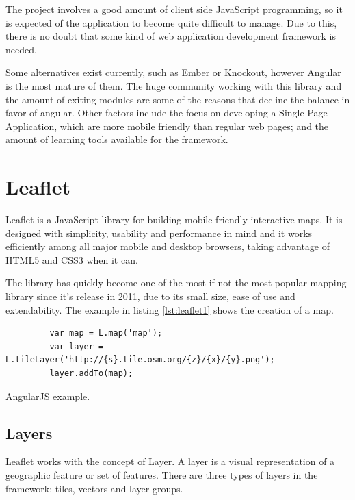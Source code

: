 The project involves a good amount of client side JavaScript programming, so it is expected of the application to become quite difficult to manage. Due to this, there is no doubt that some kind of web application development framework is needed.

Some alternatives exist currently, such as Ember or Knockout, however Angular is the most mature of them. The huge community working with this library and the amount of exiting modules are some of the reasons that decline the balance in favor of angular. Other factors include the focus on developing a Single Page Application, which are more mobile friendly than regular web pages; and the amount of learning tools available for the framework. 

\section{Leaflet}\label{sec:leaflet}

Leaflet is a JavaScript library for building mobile friendly interactive maps. It is designed with simplicity, usability and performance in mind and it works efficiently among all major mobile and desktop browsers, taking advantage of HTML5 and CSS3 when it can\cite{leafletjs}.

The library has quickly become one of the most if not the most popular mapping library since it's release in 2011, due to its small size, ease of use and extendability. The example in listing \ref{lst:leaflet1} shows the creation of a map.

\begin{listing}\centering
  \begin{minipage}{.8\textwidth}
    \begin{verbatim}
	     var map = L.map('map');
	     var layer = L.tileLayer('http://{s}.tile.osm.org/{z}/{x}/{y}.png');
	     layer.addTo(map);
    \end{verbatim}
  \end{minipage}
  \caption{AngularJS example.}\label{lst:leaflet1}
\end{listing}

\subsection*{Layers}

Leaflet works with the concept of Layer. A layer is a visual representation of a geographic feature or set of features. There are three types of layers in the framework: tiles, vectors and layer groups.

